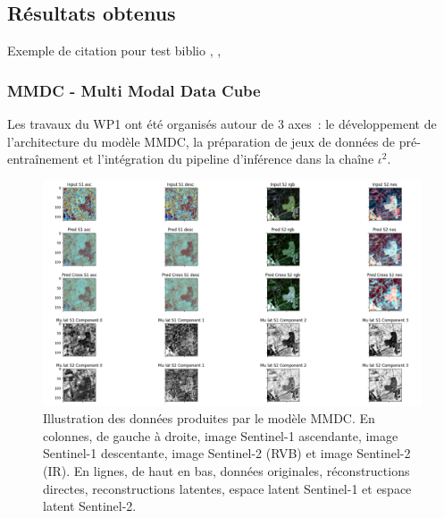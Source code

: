\subsection{Résultats obtenus}


Exemple de citation pour test biblio \citep{Luc_RS}, \citep{Luc_IGARSS22}, \citep{Luc_IGARSS21} \citep{isprs-archives-XLIII-B2-2020-703-2020} \citep{Stocker_ISPRS20} \citep{Hermann_ISPRS22} \citep{Nico_RSL} \citep{GIRYFOUQUET2021320}

\subsubsection{MMDC - Multi Modal Data Cube}
Les travaux du WP1 ont été organisés autour de 3 axes : le développement de l’architecture du modèle MMDC, la préparation de jeux de données de pré-entraînement et l’intégration du pipeline d’inférence dans la chaîne $\iota^2$.
\begin{figure}
\begin{center}
\includegraphics[width=\columnwidth]{img/wp1/mmdc5.png}
\caption{Illustration des données produites par le modèle MMDC. En colonnes, de gauche à droite, image Sentinel-1 ascendante, image Sentinel-1 descentante, image Sentinel-2 (RVB) et image Sentinel-2 (IR). En lignes, de haut en bas, données originales, réconstructions directes, reconstructions latentes, espace latent Sentinel-1 et espace latent Sentinel-2.}
\label{fig:mmdcresults}
\end{center}
\end{figure}

